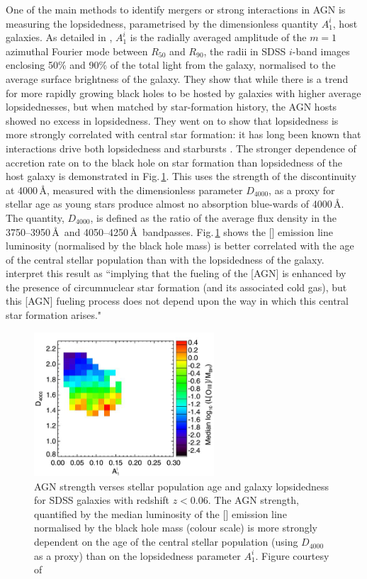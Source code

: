 			One of the main methods to identify mergers or strong interactions in AGN is measuring the lopsidedness, parametrised by the dimensionless quantity $A_1^i$, host galaxies. As detailed in \citet{Reichard2008}, $A_1^i$ is the radially averaged amplitude of the $m=1$ azimuthal Fourier mode between $R_\mathrm{50}$ and $R_\mathrm{90}$, the radii in SDSS $i$-band images enclosing 50\% and 90\% of the total light from the galaxy, normalised to the average surface brightness of the galaxy. They show that while there is a trend for more rapidly growing black holes to be hosted by galaxies with higher average lopsidednesses, but when matched by star-formation history, the AGN hosts showed no excess in lopsidedness. They went on to show that lopsidedness is more strongly correlated with central star formation: it has long been known that interactions drive both lopsidedness and starbursts \citep[e.g.][]{Larson1978}. The stronger dependence of accretion rate on to the black hole on star formation than lopsidedness of the host galaxy is demonstrated in Fig.\,\ref{fig:anisotropy}. This uses the strength of the discontinuity at 4000\,\AA, measured with the dimensionless parameter $D_\mathrm{4000}$, as a proxy for stellar age as young stars produce almost no absorption blue-wards of 4000\,\AA. The quantity, $D_\mathrm{4000}$, is defined as the ratio of the average flux density in the 3750--3950\,\AA\ and 4050--4250\,\AA\ bandpasses. Fig.\,\ref{fig:anisotropy} shows the [] emission line luminosity (normalised by the black hole mass) is better correlated with the age of the central stellar population than with the lopsidedness of the galaxy. \citet{Heckman2014} interpret this result as ``implying that the fueling of the [AGN] is enhanced by the presence of circumnuclear star formation (and its associated cold gas), but this [AGN] fueling process does not depend upon the way in which this central star formation arises."

			\begin{figure}
				\centering
				\includegraphics[width=0.6\textwidth]{introduction/age_anisotropy.jpg}
				\caption[The dependence of AGN on age and anisotropies]{AGN strength verses stellar population age and galaxy lopsidedness for SDSS galaxies with redshift $z<0.06$. The AGN strength, quantified by the median luminosity of the [] emission line normalised by the black hole mass (colour scale) is more strongly dependent on the age of the central stellar population (using $D_\mathrm{4000}$ as a proxy) than on the lopsidedness parameter $A_1^i$. Figure courtesy of \citet{Reichard2009}}
				\label{fig:anisotropy}
			\end{figure}

